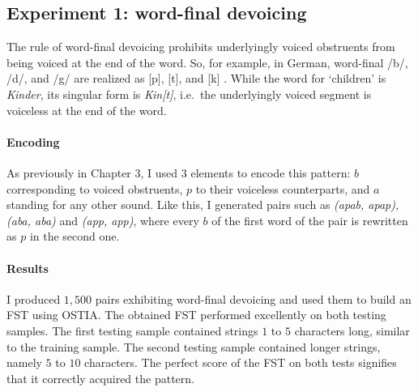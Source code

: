 \subsection{Experiment 1: word-final devoicing}

The rule of word-final devoicing prohibits underlyingly voiced obstruents from being voiced at the end of the word.
So, for example, in German, word-final /b/, /d/, and /g/ are realized as [p], [t], and [k] \citep{Wiebke1995}.
While the word for `children' is \emph{Kinder}, its singular form is \emph{Kin[t]}, i.e.\ the underlyingly voiced segment is voiceless at the end of the word.


\paragraph{Encoding}

As previously in Chapter 3, I used $3$ elements to encode this pattern: $b$ corresponding to voiced obstruents, $p$ to their voiceless counterparts, and $a$ standing for any other sound.
Like this, I generated pairs such as \emph{(apab, apap), (aba, aba)} and \emph{(app, app)}, where every $b$ of the first word of the pair is rewritten as $p$ in the second one.


\paragraph{Results}

I produced $1,500$ pairs exhibiting word-final devoicing and used them to build an FST using OSTIA.
The obtained FST performed excellently on both testing samples.
The first testing sample contained strings $1$ to $5$ characters long, similar to the training sample.
The second testing sample contained longer strings, namely $5$ to $10$ characters.
The perfect score of the FST on both tests signifies that it correctly acquired the pattern.



